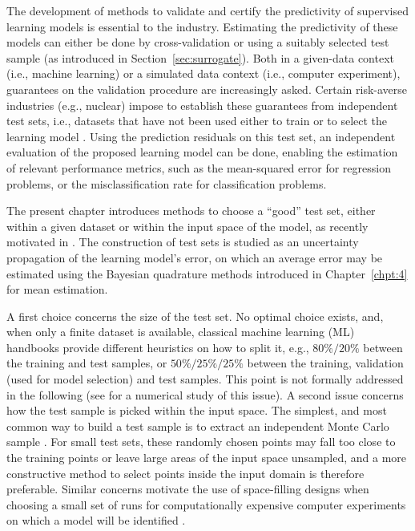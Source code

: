 
The development of methods to validate and certify the predictivity of supervised learning models is essential to the industry. 
Estimating the predictivity of these models can either be done by cross-validation or using a suitably selected test sample (as introduced in Section~\ref{sec:surrogate}). 
Both in a given-data context (i.e., machine learning) or a simulated data context (i.e., computer experiment), guarantees on the validation procedure are increasingly asked. 
Certain risk-averse industries (e.g., nuclear) impose to establish these guarantees from independent test sets, i.e., datasets that have not been used either to train or to select the learning model \citep{borjir12,xugoo18,ioo21}. 
Using the prediction residuals on this test set, an independent evaluation of the proposed learning model can be done, enabling the estimation of relevant performance metrics, such as the mean-squared error for regression problems, or the misclassification rate for classification problems.

The present chapter introduces methods to choose a ``good'' test set, either within a given dataset or within the input space of the model, as recently motivated in \citet{ioo21,josvak21}. 
The construction of test sets is studied as an uncertainty propagation of the learning model's error, on which an average error may be estimated using the Bayesian quadrature methods introduced in Chapter~\ref{chpt:4} for mean estimation. 

A first choice concerns the size of the test set. No optimal choice exists, and, when only a finite dataset is available, classical machine learning (ML) handbooks \citep{tibshirani_2009,gooben16} provide different heuristics on how to split it, e.g., $80\% / 20\%$ between the training and test samples, or $50\% / 25\% / 25\%$ between the training, validation (used for model selection) and test samples. 
This point is not formally addressed in the following (see \citealp{xugoo18} for a numerical study of this issue).   
A second issue concerns how the test sample is picked within the input space. The simplest, and most common way to build a test sample is to extract an independent Monte Carlo sample \citep{tibshirani_2009}. 
For small test sets, these randomly chosen points may fall too close to the training points or leave large areas of the input space unsampled, and a more constructive method to select points inside the input domain is therefore preferable. 
Similar concerns motivate the use of space-filling designs when choosing a small set of runs for computationally expensive computer experiments on which a model will be identified \citep{fanli06,pronzato_2012}. 

